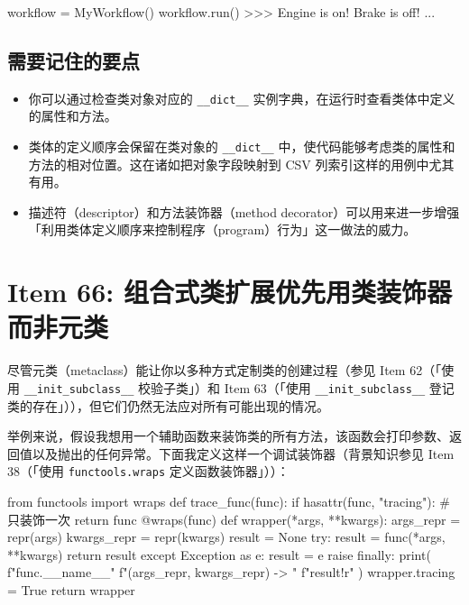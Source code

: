 \begin{codebox}[python]
workflow = MyWorkflow()
workflow.run()
>>>
Engine is on!
Brake is off!
...
\end{codebox}

\subsection{需要记住的要点}

\begin{itemize}
\item 你可以通过检查类对象对应的 \texttt{\_\_dict\_\_} 实例字典，在运行时查看类体中定义的属性和方法。
\item 类体的定义顺序会保留在类对象的 \texttt{\_\_dict\_\_} 中，使代码能够考虑类的属性和方法的相对位置。这在诸如把对象字段映射到 CSV 列索引这样的用例中尤其有用。
\item 描述符（descriptor）和方法装饰器（method decorator）可以用来进一步增强「利用类体定义顺序来控制程序（program）行为」这一做法的威力。
\end{itemize}

\section{Item 66: 组合式类扩展优先用类装饰器而非元类}

尽管元类（metaclass）能让你以多种方式定制类的创建过程（参见 Item 62（「使用 \texttt{\_\_init\_subclass\_\_} 校验子类」）和 Item 63（「使用 \texttt{\_\_init\_subclass\_\_} 登记类的存在」）），但它们仍然无法应对所有可能出现的情况。

举例来说，假设我想用一个辅助函数来装饰类的所有方法，该函数会打印参数、返回值以及抛出的任何异常。下面我定义这样一个调试装饰器（背景知识参见 Item 38（「使用 \texttt{functools.wraps} 定义函数装饰器」））：

\begin{codebox}[python]
from functools import wraps
def trace_func(func):
    if hasattr(func, "tracing"):  # 只装饰一次
        return func
    @wraps(func)
    def wrapper(*args, **kwargs):
        args_repr = repr(args)
        kwargs_repr = repr(kwargs)
        result = None
        try:
            result = func(*args, **kwargs)
            return result
        except Exception as e:
            result = e
            raise
        finally:
            print(
                f"{func.__name__}"
                f"({args_repr}, {kwargs_repr}) -> "
                f"{result!r}"
            )
    wrapper.tracing = True
    return wrapper
\end{codebox}

